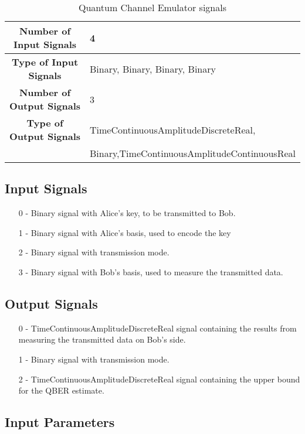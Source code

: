 \begin{table}[h]
	\begin{tabular}{|c|l|}
		\hline
		\textbf{Number of Input Signals} & 4 \\ \hline
        \textbf{Type of Input Signals} & Binary, Binary, Binary, Binary \\ \hline
    	\textbf{Number of Output Signals} & 3 \\ \hline
		\textbf{Type of Output Signals} & TimeContinuousAmplitudeDiscreteReal, \\
		& Binary,TimeContinuousAmplitudeContinuousReal \\ \hline
	\end{tabular}
	\caption{Quantum Channel Emulator signals}
	\label{table:QCE_signals}
\end{table}

\subsection*{Input Signals}

\begin{itemize}
	\item[0] - Binary signal with Alice's key, to be transmitted to Bob.
	\item[1] - Binary signal with Alice's basis, used to encode the key
	\item[2] - Binary signal with transmission mode.
	\item[3] - Binary signal with Bob's basis, used to measure the
	transmitted data.
\end{itemize}

\subsection*{Output Signals}

\begin{itemize}
	\item[0] - TimeContinuousAmplitudeDiscreteReal signal containing the
	results from measuring the transmitted data on Bob's side.
	\item[1] - Binary signal with transmission mode.
	\item[2] - TimeContinuousAmplitudeDiscreteReal signal containing the
	upper bound for the QBER estimate.
\end{itemize}


\subsection*{Input Parameters}

